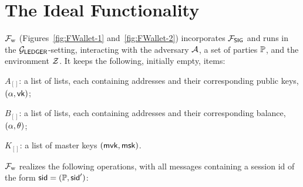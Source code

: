 \section{The Ideal Functionality}\label{sec:fwallet}

$\mathcal{F}_{\mathrm{w}}$ (Figures~\ref{fig:FWallet-1} and~\ref{fig:FWallet-2}) incorporates
$\mathcal{F}_\mathsf{SIG}$ and runs in the $\mathcal{G}_\mathsf{LEDGER}$-setting, interacting with the adversary
$\mathcal{A}$, a set of parties $\mathbb{P}$, and the environment $\mathcal{Z}$. It
keeps the following, initially empty, items:
\begin{inparaenum}[i)]
    \item $A_{[]}$: a list of lists, each containing addresses and their corresponding public keys, $(\alpha, \mathsf{vk})$;
    \item $B_{[]}$: a list of lists, each containing addresses and their corresponding balance, $(\alpha, \theta)$;
    \item $K_{[]}$: a list of master keys $(\mathsf{mvk}, \mathsf{msk})$.
\end{inparaenum}
$\mathcal{F}_{\mathrm{w}}$ realizes the following operations, with all messages containing a session
id of the form $\mathsf{sid} = (\mathbb{P}, \mathsf{sid}')$:
